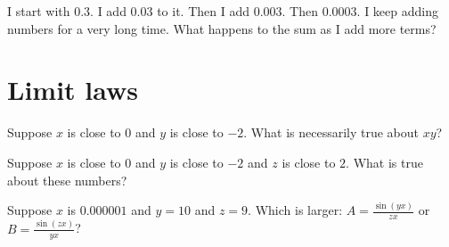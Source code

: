 \documentclass{ximera}
\begin{document}
\begin{problem}
	I start with $0.3$.  I add $0.03$ to it.  Then I add $0.003$.  Then $0.0003$.  I keep adding numbers for a very long time.  What happens to the sum as I add more terms?
	\begin{multipleChoice}
	\end{multipleChoice}
\end{problem}

\clearpage

\section{Limit laws}

\begin{problem}
  Suppose $x$ is close to $0$ and $y$ is close to $-2$.  What is necessarily true about $xy$?
  \begin{multipleChoice}
  \end{multipleChoice}
\end{problem}

\begin{problem}
  Suppose $x$ is close to $0$ and $y$ is close to $-2$ and $z$ is close to $2$.  What is true about these numbers?
  \begin{multipleChoice}
  \end{multipleChoice}
\end{problem}

\begin{problem}
  Suppose $x$ is $0.000001$ and $y = 10$ and $z = 9$.  Which is larger:
  $A = \frac{\sin (yx)}{zx}$ or $B = \frac{\sin (zx)}{yx}$?
  \begin{multipleChoice}
  \end{multipleChoice}
\end{problem}
\end{document}
